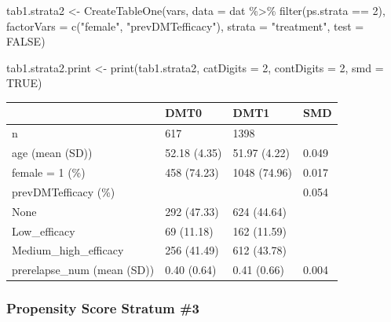 \documentclass[
  letterpaper,
  DIV=11,
  numbers=noendperiod]{scrreprt}
\newenvironment{Shaded}{\begin{snugshade}}{\end{snugshade}}
\newcommand{\AttributeTok}[1]{\textcolor[rgb]{0.40,0.45,0.13}{#1}}
\newcommand{\ConstantTok}[1]{\textcolor[rgb]{0.56,0.35,0.01}{#1}}
\newcommand{\DecValTok}[1]{\textcolor[rgb]{0.68,0.00,0.00}{#1}}
\newcommand{\FunctionTok}[1]{\textcolor[rgb]{0.28,0.35,0.67}{#1}}
\newcommand{\NormalTok}[1]{\textcolor[rgb]{0.00,0.23,0.31}{#1}}
\newcommand{\OtherTok}[1]{\textcolor[rgb]{0.00,0.23,0.31}{#1}}
\newcommand{\SpecialCharTok}[1]{\textcolor[rgb]{0.37,0.37,0.37}{#1}}
\newcommand{\StringTok}[1]{\textcolor[rgb]{0.13,0.47,0.30}{#1}}
\begin{document}
\begin{Shaded}
\begin{Highlighting}[]
\NormalTok{tab1.strata2 }\OtherTok{\textless{}{-}} \FunctionTok{CreateTableOne}\NormalTok{(vars, }\AttributeTok{data =}\NormalTok{ dat }\SpecialCharTok{\%\textgreater{}\%} \FunctionTok{filter}\NormalTok{(ps.strata }\SpecialCharTok{==} \DecValTok{2}\NormalTok{), }
                               \AttributeTok{factorVars =} \FunctionTok{c}\NormalTok{(}\StringTok{"female"}\NormalTok{, }\StringTok{"prevDMTefficacy"}\NormalTok{), }
                               \AttributeTok{strata =} \StringTok{"treatment"}\NormalTok{, }\AttributeTok{test =} \ConstantTok{FALSE}\NormalTok{)}

\NormalTok{tab1.strata2.print }\OtherTok{\textless{}{-}} \FunctionTok{print}\NormalTok{(tab1.strata2, }\AttributeTok{catDigits =} \DecValTok{2}\NormalTok{, }\AttributeTok{contDigits =} \DecValTok{2}\NormalTok{, }
                            \AttributeTok{smd =} \ConstantTok{TRUE}\NormalTok{)}
\end{Highlighting}
\end{Shaded}

\begin{longtable}[]{@{}llll@{}}
\toprule\noalign{}
& DMT0 & DMT1 & SMD \\
\midrule\noalign{}
\endhead
\bottomrule\noalign{}
\endlastfoot
n & 617 & 1398 & \\
age (mean (SD)) & 52.18 (4.35) & 51.97 (4.22) & 0.049 \\
female = 1 (\%) & 458 (74.23) & 1048 (74.96) & 0.017 \\
prevDMTefficacy (\%) & & & 0.054 \\
None & 292 (47.33) & 624 (44.64) & \\
Low\_efficacy & 69 (11.18) & 162 (11.59) & \\
Medium\_high\_efficacy & 256 (41.49) & 612 (43.78) & \\
prerelapse\_num (mean (SD)) & 0.40 (0.64) & 0.41 (0.66) & 0.004 \\
\end{longtable}

\hypertarget{propensity-score-stratum-3}{%
\subsubsection{Propensity Score Stratum
\#3}\label{propensity-score-stratum-3}}
\end{document}
